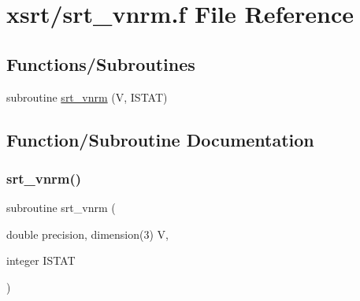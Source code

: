 \hypertarget{srt__vnrm_8f}{}\section{xsrt/srt\+\_\+vnrm.f File Reference}
\label{srt__vnrm_8f}
\subsection*{Functions/\+Subroutines}
\begin{DoxyCompactItemize}
\item 
subroutine \hyperlink{srt__vnrm_8f_aa326e5a1c9391df117045fcc9450c863}{srt\+\_\+vnrm} (V, I\+S\+T\+AT)
\end{DoxyCompactItemize}


\subsection{Function/\+Subroutine Documentation}
\mbox{\label{srt__vnrm_8f_aa326e5a1c9391df117045fcc9450c863}} 
\subsubsection{\texorpdfstring{srt\+\_\+vnrm()}{srt\_vnrm()}}
{\footnotesize\ttfamily subroutine srt\+\_\+vnrm (\begin{DoxyParamCaption}\item[{double precision, dimension(3)}]{V,  }\item[{integer}]{I\+S\+T\+AT }\end{DoxyParamCaption})}

